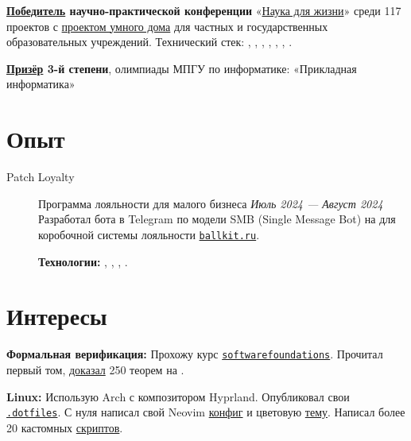 \documentclass[margin,line]{resume}
\begin{document}
\begin{resume}
  \textbf{\href{https://alchemmist.github.io/CV/attachments/scince-for-life-win.pdf}{Победитель}
  научно-практической конференции}
  «\href{https://conf.profil.mos.ru/academ}{Наука для
  жизни}» среди 117 проектов с
  \href{https://github.com/smart-cab/}{проектом умного
  дома} для частных и государственных
  образовательных учреждений. Технический стек: ,
  , , ,
  , , .

  \textbf{\href{https://alchemmist.github.io/CV/attachments/informatics-olimpic.pdf}{Призёр}
  3-й степени}, олимпиады МПГУ по информатике:
  «Прикладная информатика»
  \vspace{-2mm}
  \section{\mysidestyle Опыт}\vspace{2mm}

  \begin{description}

    \item[Patch Loyalty] Программа лояльности для малого бизнеса \hfill
      \textsl{Июль 2024 — Август 2024\vspace{1mm}}\\
      Разработал бота в Telegram по модели SMB (Single Message Bot) на
       для коробочной системы лояльности
      \href{https://ballkit.ru}{\texttt{ballkit.ru}}.

      \textbf{Технологии:}
      ,
      , ,
      .
  \end{description}
  \vspace{-4mm}
  \section{\mysidestyle Интересы}\vspace{0.7mm}

  {\textbf{Формальная верификация:} Прохожу курс
    \texttt{\href{https://softwarefoundations.cis.upenn.edu}{softwarefoundations}}.
    Прочитал первый том,
    \href{https://github.com/alchemmist/coq-learning}{доказал} 250
  теорем на .} \\

  \vspace{-6mm}

  \textbf{Linux:} Использую Arch с композитором Hyprland. Опубликовал
  свои
  \href{https:/github.com/alchemmist/.dotfiles}{\texttt{.dotfiles}}.
  С нуля написал свой Neovim
  \href{https://github.com/alchemmist/.dotfiles/tree/main/nvim}{конфиг}
  и цветовую
  \href{https://github.com/alchemmist/nothing.nvim}{тему}.
  Написал более 20 кастомных
  \href{https://github.com/alchemmist/.dotfiles/tree/main/scripts}{скриптов}.

\end{resume}
\end{document}

